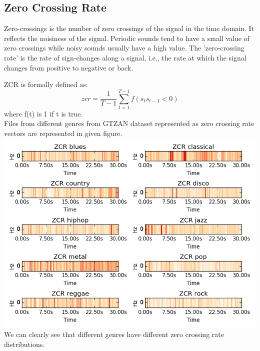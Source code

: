 \documentclass[conference]{IEEEtran}
\begin{document}
\subsection{Zero Crossing Rate}
Zero-crossings is the number of zero crossings of the signal in the time domain. It reflects the noisiness of the signal. Periodic sounds tend to have a small value of zero crossings while noisy sounds usually have a high value. The 'zero-crossing rate' is the rate of sign-changes along a signal, i.e., the rate at which the signal changes from positive to negative or back.\cite{wiki}\par
ZCR is formally defined as:
\begin{equation}
    zcr=\frac{1}{T-1} \sum_{t=1}^{T-1} f(s_t s_{t-1} < 0)
\end{equation}
where f(t) is 1 if t is true.\\
Files from different genres from GTZAN dataset represented as zero crossing rate vectors are represented in given figure. \\
\includegraphics[width=\columnwidth]{ZCR_fig}
We can clearly see that different genres have different zero crossing rate distributions.
\end{document}
